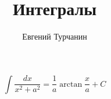 \documentclass{report}
\title{\Huge{Интегралы}}
\author{\huge{Евгений Турчанин}}
\date{}
\begin{document}
\maketitle


$$
\int \frac{dx}{x^2 + a^2} = \frac{1}{a} \arctan \frac{x}{a} + C
$$
\end{document}
